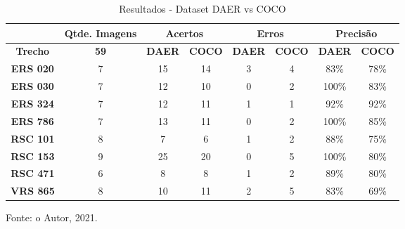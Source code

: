 \begin{table}[htp]
\centering
\caption{Resultados - Dataset DAER vs COCO}
\label{tab:results_daer_coco}
{%
\begin{tabular}{cccccccc}
\hline
\textbf{}       & \textbf{Qtde. Imagens} & \multicolumn{2}{c}{\textbf{Acertos}} & \multicolumn{2}{c}{\textbf{Erros}} & \multicolumn{2}{c}{\textbf{Precisão}} \\ \hline
\textbf{Trecho} & \textbf{59}            & \textbf{DAER}     & \textbf{COCO}    & \textbf{DAER}    & \textbf{COCO}   & \textbf{DAER}    & \textbf{COCO}   \\ \hline
\textbf{ERS 020} & 7 & 15 & 14 & 3 & 4 & 83\%  & 78\% \\
\textbf{ERS 030} & 7 & 12 & 10 & 0 & 2 & 100\% & 83\% \\
\textbf{ERS 324} & 7 & 12 & 11 & 1 & 1 & 92\%  & 92\% \\
\textbf{ERS 786} & 7 & 13 & 11 & 0 & 2 & 100\% & 85\% \\
\textbf{RSC 101} & 8 & 7  & 6  & 1 & 2 & 88\%  & 75\% \\
\textbf{RSC 153} & 9 & 25 & 20 & 0 & 5 & 100\% & 80\% \\
\textbf{RSC 471} & 6 & 8  & 8  & 1 & 2 & 89\%  & 80\% \\
\textbf{VRS 865} & 8 & 10 & 11 & 2 & 5 & 83\%  & 69\% \\ \hline
\end{tabular}%

Fonte: o Autor, 2021.
}
\end{table}